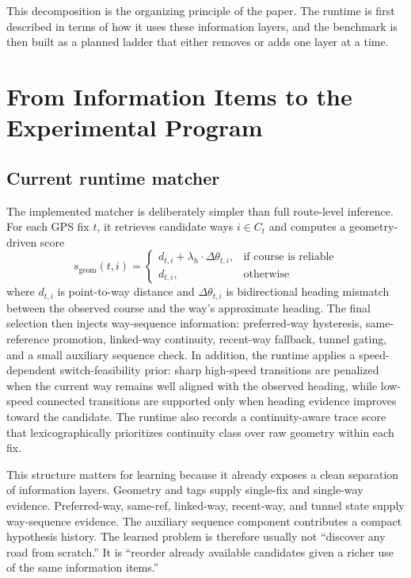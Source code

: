 \documentclass{article}
\begin{document}
This decomposition is the organizing principle of the paper. The runtime is first described in terms of how it uses these information layers, and the benchmark is then built as a planned ladder that either removes or adds one layer at a time.

\section{From Information Items to the Experimental Program}
\subsection{Current runtime matcher}
The implemented matcher is deliberately simpler than full route-level inference. For each GPS fix \(t\), it retrieves candidate ways \(i \in C_t\) and computes a geometry-driven score
\[
s_{\mathrm{geom}}(t,i)=
\begin{cases}
d_{t,i} + \lambda_h \cdot \Delta\theta_{t,i}, & \text{if course is reliable} \\
d_{t,i}, & \text{otherwise}
\end{cases}
\]
where \(d_{t,i}\) is point-to-way distance and \(\Delta\theta_{t,i}\) is bidirectional heading mismatch between the observed course and the way's approximate heading. The final selection then injects way-sequence information: preferred-way hysteresis, same-reference promotion, linked-way continuity, recent-way fallback, tunnel gating, and a small auxiliary sequence check. In addition, the runtime applies a speed-dependent switch-feasibility prior: sharp high-speed transitions are penalized when the current way remains well aligned with the observed heading, while low-speed connected transitions are supported only when heading evidence improves toward the candidate. The runtime also records a continuity-aware trace score that lexicographically prioritizes continuity class over raw geometry within each fix.

This structure matters for learning because it already exposes a clean separation of information layers. Geometry and tags supply single-fix and single-way evidence. Preferred-way, same-ref, linked-way, recent-way, and tunnel state supply way-sequence evidence. The auxiliary sequence component contributes a compact hypothesis history. The learned problem is therefore usually not ``discover any road from scratch.'' It is ``reorder already available candidates given a richer use of the same information items.'' 
\end{document}
